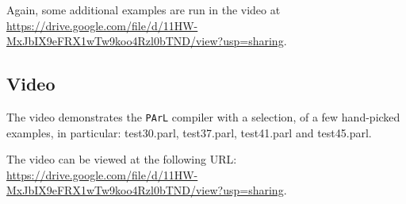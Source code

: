 Again, some additional examples are run in the video at
\url{https://drive.google.com/file/d/11HW-MxJbIX9eFRX1wTw9koo4Rzl0bTND/view?usp=sharing}.

\subsection{Video}

The video demonstrates the \texttt{PArL} compiler with a
selection, of a few hand-picked examples, in particular:
test30.parl, test37.parl, test41.parl and test45.parl.

The video can be viewed at the following URL:
\url{https://drive.google.com/file/d/11HW-MxJbIX9eFRX1wTw9koo4Rzl0bTND/view?usp=sharing}.
